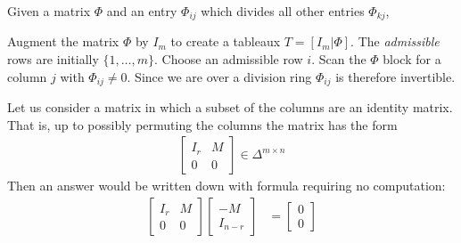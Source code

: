 \documentclass[12pt,twoside,dvipsnames,letterpaper]{memoir}
\begin{document}
Given a matrix $\Phi$ and an entry $\Phi_{ij}$ which divides 
all other entries $\Phi_{kj}$,

Augment the matrix $\Phi$ by $I_m$ to create a tableaux
$T=[I_m | \Phi]$.  
The \emph{admissible} rows are initially $\{1,\ldots,m\}$.
Choose an admissible row $i$.  Scan the $\Phi$ block for 
a column $j$ with $\Phi_{ij}\neq 0$. Since we 
are over a division ring $\Phi_{ij}$ is therefore invertible.


Let us consider a matrix in which a subset of the columns 
are an identity matrix.  That is, up to possibly permuting 
the columns the matrix has the form
\begin{align*}
    \begin{bmatrix}
        I_r & M \\ 
        0 & 0 
    \end{bmatrix}\in \Delta^{m\times n}
\end{align*}
Then an answer would be written down with formula 
requiring no computation:
\begin{align*}
    \begin{bmatrix}
        I_r & M \\ 
        0 & 0 
    \end{bmatrix}
    \begin{bmatrix}
        -M  \\ 
        I_{n-r} 
    \end{bmatrix}
    & = 
    \begin{bmatrix}
        0\\
        0
    \end{bmatrix}
\end{align*}
\end{document}
